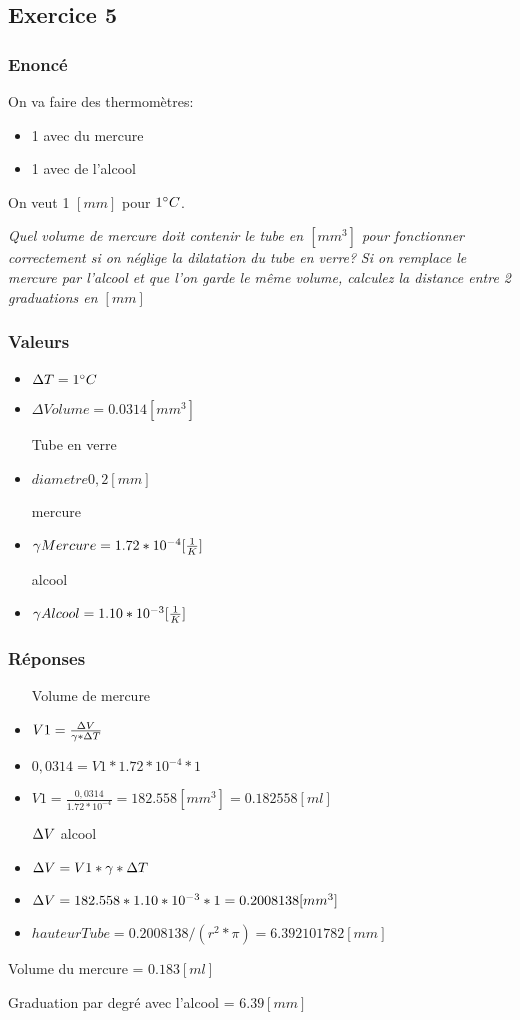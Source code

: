 
\subsection{Exercice 5}
\subsubsection{Enoncé}
On va faire des thermomètres:
\begin{itemize}
    \item 1 avec du mercure
    \item 1 avec de l'alcool
\end{itemize}
On veut 1 $[mm]$ pour $1\celsius$.

\textit{Quel volume de mercure doit contenir le tube en $[mm^3]$ pour fonctionner correctement si on néglige la dilatation du tube en verre?}
\textit{Si on remplace le mercure par l'alcool et que l'on garde le même volume, calculez la distance entre 2 graduations en $[mm]$}
\subsubsection{Valeurs}
\begin{itemize}
    \item $\Delta{T} = 1\celsius$
    \item $\Delta{Volume} = 0.0314[mm^{3}]$
    \item[Tube en verre]
    \item $diametre 0,2[mm]$
    \item[mercure]
    \item $\gamma{Mercure} = 1.72*10^{-4}[\dila]$
    \item[alcool] 
    \item $\gamma{Alcool} = 1.10*10^{-3}[\dila]$
\end{itemize}

\subsubsection{Réponses}
\begin{itemize} 
    \item[Volume de mercure]
    \item $V1 = \frac{\dV}{\gamma * \dT}$
    \item $0,0314 = V1 * 1.72*10^{-4} * 1$
    \item $V1 = \frac{0,0314}{1.72*10^{-4}} = 182.558[mm^3] = 0.182558[ml]$
    \item[$\dV$ alcool]
    \item $\dV = V1*\gamma * \dT$
    \item $\dV = 182.558 * 1.10*10^{-3} * 1 = 0.2008138[mm^3]$
    \item $hauteurTube = 0.2008138 / (r^2 * \pi) = 6.392101782 [mm]$ 
\end{itemize}

Volume du mercure = $0.183[ml]$

Graduation par degré avec l'alcool = $6.39[mm]$
